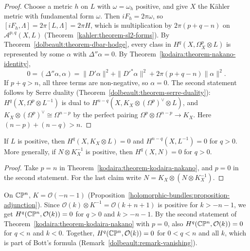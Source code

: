 \begin{proof}
Choose a metric $h$ on $L$ with $\omega = \omega_h$ positive, and give $X$ the K\"ahler metric with fundamental form $\omega$. Then
$iF_h = 2\pi\omega$, so $[iF_h, \Lambda] = 2\pi[L, \Lambda] = 2\pi H$, which is multiplication by $2\pi(p + q - n)$ on $\mathcal{A}^{p,q}(X, L)$
(Theorem~\ref{kahler:theorem-sl2-forms}). By Theorem~\ref{dolbeault:theorem-dbar-hodge}, every class in $H^q(X, \Omega^p_X \otimes L)$ is
represented by some $\alpha$ with $\Delta''\alpha = 0$. By Theorem~\ref{kodaira:theorem-nakano-identity},
\[
0 = (\Delta''\alpha, \alpha) = \|D'\alpha\|^2 + \|D'^*\alpha\|^2 + 2\pi(p + q - n)\|\alpha\|^2 .
\]
If $p + q > n$, all three terms are non-negative, so $\alpha = 0$. The second statement follows by Serre duality
(Theorem~\ref{dolbeault:theorem-serre-duality}): $H^q(X, \Omega^p \otimes L^{-1})$ is dual to $H^{n-q}(X, K_X \otimes (\Omega^p)^\vee \otimes L)$, and
$K_X \otimes (\Omega^p)^\vee \cong \Omega^{n-p}$ by the perfect pairing $\Omega^p \otimes \Omega^{n-p} \to K_X$. Here $(n - p) + (n - q) > n$.
\end{proof}

\begin{corollary}\label{kodaira:corollary-kodaira-vanishing}
If $L$ is positive, then $H^q(X, K_X \otimes L) = 0$ and $H^{n-q}(X, L^{-1}) = 0$ for $q > 0$. More generally, if $N \otimes K_X^{-1}$ is
positive, then $H^q(X, N) = 0$ for $q > 0$.
\end{corollary}

\begin{proof}
Take $p = n$ in Theorem~\ref{kodaira:theorem-kodaira-nakano}, and $p = 0$ in the second statement. For the last claim write
$N = K_X \otimes (N \otimes K_X^{-1})$.
\end{proof}

\begin{example}\label{kodaira:example-projective-space}
On $\mathbb{C}\mathbb{P}^n$, $K = \mathcal{O}(-n-1)$ (Proposition~\ref{holomorphic-bundles:proposition-adjunction}). Since $\mathcal{O}(k) \otimes K^{-1} = \mathcal{O}(k + n + 1)$
is positive for $k > -n - 1$, we get $H^q(\mathbb{C}\mathbb{P}^n, \mathcal{O}(k)) = 0$ for $q > 0$ and $k > -n - 1$. By the second statement of
Theorem~\ref{kodaira:theorem-kodaira-nakano} with $p = 0$, also $H^q(\mathbb{C}\mathbb{P}^n, \mathcal{O}(k)) = 0$ for $q < n$ and $k < 0$. Together,
$H^q(\mathbb{C}\mathbb{P}^n, \mathcal{O}(k)) = 0$ for $0 < q < n$ and all $k$, which is part of Bott's formula (Remark~\ref{dolbeault:remark-vanishing}).
\end{example}

